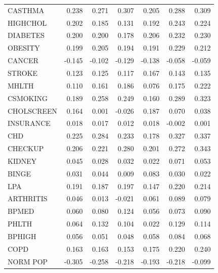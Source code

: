 \documentclass[letterpaper, inpress]{jds} %
\renewcommand{\_}{%
    \textunderscore\hspace{0pt}%
}
\begin{document}
\begin{table}[!h]
\begin{center}
\begin{tabular}{lrrrrrr}
CASTHMA                 & 0.238       & 0.271       & 0.307       & 0.205       & 0.288       & 0.309     \\
HIGHCHOL                & 0.202       & 0.185       & 0.131       & 0.192       & 0.243       & 0.224     \\
DIABETES                & 0.200       & 0.200     & 0.178         & 0.206       & 0.232       & 0.230     \\
OBESITY                 & 0.199       & 0.205       & 0.194       & 0.191       & 0.229       & 0.212     \\
CANCER                  & -0.145      & -0.102      & -0.129      & -0.138      & -0.058      & -0.059    \\
STROKE                  & 0.123       & 0.125       & 0.117       & 0.167       & 0.143       & 0.135     \\
MHLTH                   & 0.110       & 0.161       & 0.186       & 0.076       & 0.175       & 0.222     \\
CSMOKING                & 0.189       & 0.258       & 0.249       & 0.160        & 0.289       & 0.323     \\
CHOLSCREEN              & 0.164       & 0.001       & -0.026      & 0.187       & 0.070       & 0.038     \\
INSURANCE               & 0.018       & 0.017       & 0.012       & 0.018       & -0.002      & 0.001     \\
CHD                     & 0.225       & 0.284       & 0.233       & 0.178       & 0.327       & 0.337     \\
CHECKUP                 & 0.206       & 0.221       & 0.280       & 0.201       & 0.272       & 0.343     \\
KIDNEY                  & 0.045       & 0.028       & 0.032       & 0.022       & 0.071       & 0.053     \\
BINGE                   & 0.031       & 0.044       & 0.009       & 0.083       & 0.030       & 0.022     \\
LPA                     & 0.191       & 0.187       & 0.197       & 0.147       & 0.220       & 0.214     \\
ARTHRITIS               & 0.046       & 0.013       & -0.021      & 0.061       & 0.089       & 0.079     \\
BPMED                   & 0.060       & 0.080        & 0.124       & 0.056       & 0.073      & 0.090      \\
PHLTH                   & 0.064       & 0.132       & 0.104       & 0.022       & 0.129       & 0.114     \\
BPHIGH                  & 0.056       & 0.051       & 0.048       & 0.058       & 0.084       & 0.068     \\
COPD                    & 0.163       & 0.163       & 0.153       & 0.175       & 0.220       & 0.240     \\
NORM\_POP               & -0.305      & -0.258      & -0.218      & -0.193      & -0.218      & -0.099  \\
\bottomrule
\end{tabular}
\end{center}
\end{table}
\end{document}
